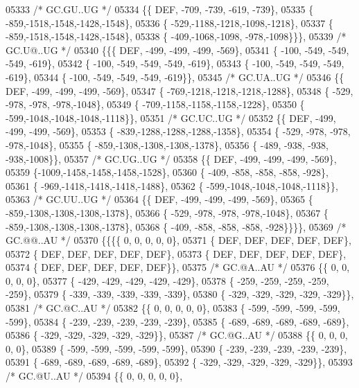 \begin{DoxyCode}
05333 \textcolor{comment}{/* GC.GU..UG */}
05334 \{\{  DEF, -709, -739, -619, -739\},
05335 \{ -859,-1518,-1548,-1428,-1548\},
05336 \{ -529,-1188,-1218,-1098,-1218\},
05337 \{ -859,-1518,-1548,-1428,-1548\},
05338 \{ -409,-1068,-1098, -978,-1098\}\}\},
05339 \textcolor{comment}{/* GC.U@..UG */}
05340 \{\{\{  DEF, -499, -499, -499, -569\},
05341 \{ -100, -549, -549, -549, -619\},
05342 \{ -100, -549, -549, -549, -619\},
05343 \{ -100, -549, -549, -549, -619\},
05344 \{ -100, -549, -549, -549, -619\}\},
05345 \textcolor{comment}{/* GC.UA..UG */}
05346 \{\{  DEF, -499, -499, -499, -569\},
05347 \{ -769,-1218,-1218,-1218,-1288\},
05348 \{ -529, -978, -978, -978,-1048\},
05349 \{ -709,-1158,-1158,-1158,-1228\},
05350 \{ -599,-1048,-1048,-1048,-1118\}\},
05351 \textcolor{comment}{/* GC.UC..UG */}
05352 \{\{  DEF, -499, -499, -499, -569\},
05353 \{ -839,-1288,-1288,-1288,-1358\},
05354 \{ -529, -978, -978, -978,-1048\},
05355 \{ -859,-1308,-1308,-1308,-1378\},
05356 \{ -489, -938, -938, -938,-1008\}\},
05357 \textcolor{comment}{/* GC.UG..UG */}
05358 \{\{  DEF, -499, -499, -499, -569\},
05359 \{-1009,-1458,-1458,-1458,-1528\},
05360 \{ -409, -858, -858, -858, -928\},
05361 \{ -969,-1418,-1418,-1418,-1488\},
05362 \{ -599,-1048,-1048,-1048,-1118\}\},
05363 \textcolor{comment}{/* GC.UU..UG */}
05364 \{\{  DEF, -499, -499, -499, -569\},
05365 \{ -859,-1308,-1308,-1308,-1378\},
05366 \{ -529, -978, -978, -978,-1048\},
05367 \{ -859,-1308,-1308,-1308,-1378\},
05368 \{ -409, -858, -858, -858, -928\}\}\}\},
05369 \textcolor{comment}{/* GC.@@..AU */}
05370 \{\{\{\{    0,    0,    0,    0,    0\},
05371 \{  DEF,  DEF,  DEF,  DEF,  DEF\},
05372 \{  DEF,  DEF,  DEF,  DEF,  DEF\},
05373 \{  DEF,  DEF,  DEF,  DEF,  DEF\},
05374 \{  DEF,  DEF,  DEF,  DEF,  DEF\}\},
05375 \textcolor{comment}{/* GC.@A..AU */}
05376 \{\{    0,    0,    0,    0,    0\},
05377 \{ -429, -429, -429, -429, -429\},
05378 \{ -259, -259, -259, -259, -259\},
05379 \{ -339, -339, -339, -339, -339\},
05380 \{ -329, -329, -329, -329, -329\}\},
05381 \textcolor{comment}{/* GC.@C..AU */}
05382 \{\{    0,    0,    0,    0,    0\},
05383 \{ -599, -599, -599, -599, -599\},
05384 \{ -239, -239, -239, -239, -239\},
05385 \{ -689, -689, -689, -689, -689\},
05386 \{ -329, -329, -329, -329, -329\}\},
05387 \textcolor{comment}{/* GC.@G..AU */}
05388 \{\{    0,    0,    0,    0,    0\},
05389 \{ -599, -599, -599, -599, -599\},
05390 \{ -239, -239, -239, -239, -239\},
05391 \{ -689, -689, -689, -689, -689\},
05392 \{ -329, -329, -329, -329, -329\}\},
05393 \textcolor{comment}{/* GC.@U..AU */}
05394 \{\{    0,    0,    0,    0,    0\},

\end{DoxyCode}
